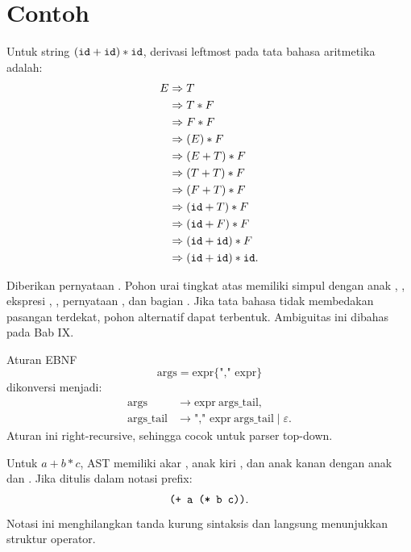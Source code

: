 \section*{Contoh}

\begin{contoh}
Untuk string \((\texttt{id} + \texttt{id}) * \texttt{id}\), derivasi
leftmost pada tata bahasa aritmetika adalah:
\[
\begin{aligned}
E &\Rightarrow T\\
  &\Rightarrow T * F\\
  &\Rightarrow F * F\\
  &\Rightarrow (E) * F\\
  &\Rightarrow (E + T) * F\\
  &\Rightarrow (T + T) * F\\
  &\Rightarrow (F + T) * F\\
  &\Rightarrow (\texttt{id} + T) * F\\
  &\Rightarrow (\texttt{id} + F) * F\\
  &\Rightarrow (\texttt{id} + \texttt{id}) * F\\
  &\Rightarrow (\texttt{id} + \texttt{id}) * \texttt{id}.
\end{aligned}
\]
\end{contoh}

\begin{contoh}
Diberikan pernyataan . Pohon urai
tingkat atas memiliki simpul  dengan anak
, , ekspresi , ,
pernyataan , dan bagian . Jika tata bahasa
tidak membedakan pasangan  terdekat, pohon alternatif
dapat terbentuk. Ambiguitas ini dibahas pada Bab IX.
\end{contoh}

\begin{contoh}
Aturan EBNF
\[
\text{args} = \text{expr} \{\text{"," expr}\}
\]
dikonversi menjadi:
\[
\begin{aligned}
\text{args} &\to \text{expr}\ \text{args\_tail},\\
\text{args\_tail} &\to \text{"," expr}\ \text{args\_tail}
\mid \varepsilon.
\end{aligned}
\]
Aturan ini right-recursive, sehingga cocok untuk parser top-down.
\end{contoh}

\begin{contoh}
Untuk \(a + b * c\), AST memiliki akar \code{+}, anak kiri
, dan anak kanan \code{*} dengan anak  dan
. Jika ditulis dalam notasi prefix:
\[
\texttt{(+ a (* b c))}.
\]
Notasi ini menghilangkan tanda kurung sintaksis dan langsung
menunjukkan struktur operator.
\end{contoh}

